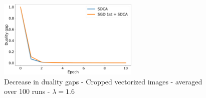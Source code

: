 \documentclass[10pt,a4paper]{article}
\begin{document}
\begin{figure}
	\centering
	\includegraphics[width=0.6\textwidth]{Graphs/duality_original3_mc100.pdf}
  \caption{Decrease in duality gaps - Cropped vectorized images - averaged over 100 runs - $\lambda = 1.6$}\label{find_centre}
\end{figure}



\printbibliography
\end{document}
